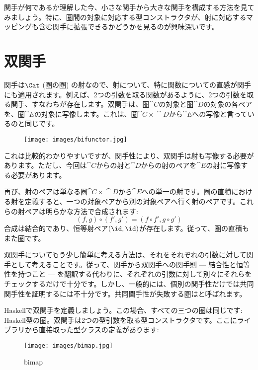 
\lettrine[lhang=0.17]{関}{手}が何であるか理解した今、小さな関手から大きな関手を構成する方法を見てみましょう。特に、圏間の対象に対応する型コンストラクタが、射に対応するマッピングも含む関手に拡張できるかどうかを見るのが興味深いです。

\section{双関手}

関手は$\Cat$ (圏の圏) の射なので、射について、特に関数についての直感が関手にも適用されます。例えば、2つの引数を取る関数があるように、2つの引数を取る関手、すなわちが存在します。双関手は、圏$\cat{C}$の対象と圏$\cat{D}$の対象の各ペアを、圏$\cat{E}$の対象に写像します。これは、圏$\cat{C}\times{}\cat{D}$から$\cat{E}$への写像と言っているのと同じです。

\begin{figure}[H]
  \centering\texttt{[image: images/bifunctor.jpg]}
\end{figure}

\noindent
これは比較的わかりやすいですが、関手性により、双関手は射も写像する必要があります。ただし、今回は$\cat{C}$からの射と$\cat{D}$からの射のペアを$\cat{E}$の射に写像する必要があります。

再び、射のペアは単なる圏$\cat{C}\times{}\cat{D}$から$\cat{E}$への単一の射です。圏の直積における射を定義すると、一つの対象ペアから別の対象ペアへ行く射のペアです。これらの射ペアは明らかな方法で合成されます: 
\[(f, g) \circ (f', g') = (f \circ f', g \circ g')\]
合成は結合的であり、恒等射ペア$(\id, \id)$が存在します。従って、圏の直積もまた圏です。

双関手についてもう少し簡単に考える方法は、それをそれぞれの引数に対して関手として考えることです。従って、関手から双関手への関手則 --- 結合性と恒等性を持つこと --- を翻訳する代わりに、それぞれの引数に対して別々にそれらをチェックするだけで十分です。しかし、一般的には、個別の関手性だけでは共同関手性を証明するには不十分です。共同関手性が失敗する圏はと呼ばれます。

Haskellで双関手を定義しましょう。この場合、すべての三つの圏は同じです: Haskell型の圏。双関手は2つの型引数を取る型コンストラクタです。ここにライブラリから直接取った型クラスの定義があります: 


\begin{figure}[H]
  \centering\texttt{[image: images/bimap.jpg]}
  \caption{bimap}
\end{figure}

